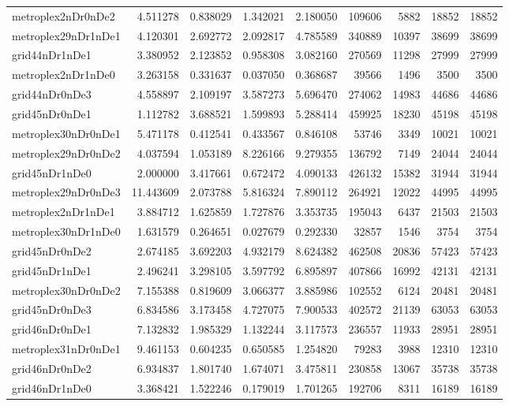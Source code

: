 \documentclass[../../../thesis.tex]{subfiles}
\begin{document}
\begin{longtable}{|l|r|r|r|r|r|r|r|r|}
metroplex2nDr0nDe2 & 4.511278 & 0.838029 & 1.342021 & 2.180050 & 109606 & 5882 & 18852 & 18852 \\
metroplex29nDr1nDe1 & 4.120301 & 2.692772 & 2.092817 & 4.785589 & 340889 & 10397 & 38699 & 38699 \\
grid44nDr1nDe1 & 3.380952 & 2.123852 & 0.958308 & 3.082160 & 270569 & 11298 & 27999 & 27999 \\
metroplex2nDr1nDe0 & 3.263158 & 0.331637 & 0.037050 & 0.368687 & 39566 & 1496 & 3500 & 3500 \\
grid44nDr0nDe3 & 4.558897 & 2.109197 & 3.587273 & 5.696470 & 274062 & 14983 & 44686 & 44686 \\
grid45nDr0nDe1 & 1.112782 & 3.688521 & 1.599893 & 5.288414 & 459925 & 18230 & 45198 & 45198 \\
metroplex30nDr0nDe1 & 5.471178 & 0.412541 & 0.433567 & 0.846108 & 53746 & 3349 & 10021 & 10021 \\
metroplex29nDr0nDe2 & 4.037594 & 1.053189 & 8.226166 & 9.279355 & 136792 & 7149 & 24044 & 24044 \\
grid45nDr1nDe0 & 2.000000 & 3.417661 & 0.672472 & 4.090133 & 426132 & 15382 & 31944 & 31944 \\
metroplex29nDr0nDe3 & 11.443609 & 2.073788 & 5.816324 & 7.890112 & 264921 & 12022 & 44995 & 44995 \\
metroplex2nDr1nDe1 & 3.884712 & 1.625859 & 1.727876 & 3.353735 & 195043 & 6437 & 21503 & 21503 \\
metroplex30nDr1nDe0 & 1.631579 & 0.264651 & 0.027679 & 0.292330 & 32857 & 1546 & 3754 & 3754 \\
grid45nDr0nDe2 & 2.674185 & 3.692203 & 4.932179 & 8.624382 & 462508 & 20836 & 57423 & 57423 \\
grid45nDr1nDe1 & 2.496241 & 3.298105 & 3.597792 & 6.895897 & 407866 & 16992 & 42131 & 42131 \\
metroplex30nDr0nDe2 & 7.155388 & 0.819609 & 3.066377 & 3.885986 & 102552 & 6124 & 20481 & 20481 \\
grid45nDr0nDe3 & 6.834586 & 3.173458 & 4.727075 & 7.900533 & 402572 & 21139 & 63053 & 63053 \\
grid46nDr0nDe1 & 7.132832 & 1.985329 & 1.132244 & 3.117573 & 236557 & 11933 & 28951 & 28951 \\
metroplex31nDr0nDe1 & 9.461153 & 0.604235 & 0.650585 & 1.254820 & 79283 & 3988 & 12310 & 12310 \\
grid46nDr0nDe2 & 6.934837 & 1.801740 & 1.674071 & 3.475811 & 230858 & 13067 & 35738 & 35738 \\
grid46nDr1nDe0 & 3.368421 & 1.522246 & 0.179019 & 1.701265 & 192706 & 8311 & 16189 & 16189 \\

\end{longtable}
\end{document}
